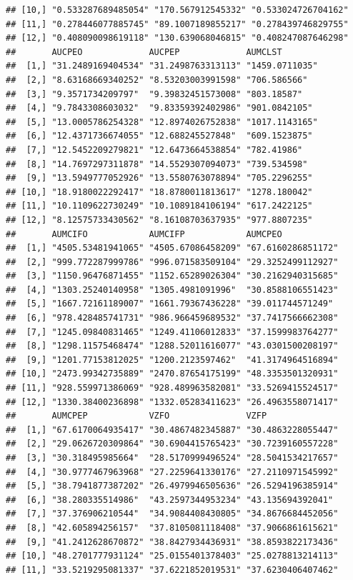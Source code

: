 \documentclass[]{krantz}
\theoremstyle{definition}
\theoremstyle{definition}
\theoremstyle{definition}
\theoremstyle{remark}
\begin{document}
\begin{verbatim}
## [10,] "0.533287689485054" "170.567912545332" "0.533024726704162"
## [11,] "0.278446077885745" "89.1007189855217" "0.278439746829755"
## [12,] "0.408090098619118" "130.639068046815" "0.408247087646298"
##       AUCPEO             AUCPEP             AUMCLST       
##  [1,] "31.2489169404534" "31.2498763313113" "1459.0711035"
##  [2,] "8.63168669340252" "8.53203003991598" "706.586566"  
##  [3,] "9.3571734209797"  "9.39832451573008" "803.18587"   
##  [4,] "9.7843308603032"  "9.83359392402986" "901.0842105" 
##  [5,] "13.0005786254328" "12.8974026752838" "1017.1143165"
##  [6,] "12.4371736674055" "12.688245527848"  "609.1523875" 
##  [7,] "12.5452209279821" "12.6473664538854" "782.41986"   
##  [8,] "14.7697297311878" "14.5529307094073" "739.534598"  
##  [9,] "13.5949777052926" "13.5580763078894" "705.2296255" 
## [10,] "18.9180022292417" "18.8780011813617" "1278.180042" 
## [11,] "10.1109622730249" "10.1089184106194" "617.2422125" 
## [12,] "8.12575733430562" "8.16108703637935" "977.8807235" 
##       AUMCIFO            AUMCIFP            AUMCPEO           
##  [1,] "4505.53481941065" "4505.67086458209" "67.6160286851172"
##  [2,] "999.772287999786" "996.071583509104" "29.3252499112927"
##  [3,] "1150.96476871455" "1152.65289026304" "30.2162940315685"
##  [4,] "1303.25240140958" "1305.4981091996"  "30.8588106551423"
##  [5,] "1667.72161189007" "1661.79367436228" "39.011744571249" 
##  [6,] "978.428485741731" "986.966459689532" "37.7417566662308"
##  [7,] "1245.09840831465" "1249.41106012833" "37.1599983764277"
##  [8,] "1298.11575468474" "1288.52011616077" "43.0301500208197"
##  [9,] "1201.77153812025" "1200.2123597462"  "41.3174964516894"
## [10,] "2473.99342735889" "2470.87654175199" "48.3353501320931"
## [11,] "928.559971386069" "928.489963582081" "33.5269415524517"
## [12,] "1330.38400236898" "1332.05283411623" "26.4963558071417"
##       AUMCPEP            VZFO               VZFP              
##  [1,] "67.6170064935417" "30.4867482345887" "30.4863228055447"
##  [2,] "29.0626720309864" "30.6904415765423" "30.7239160557228"
##  [3,] "30.318495985664"  "28.5170999496524" "28.5041534217657"
##  [4,] "30.9777467963968" "27.2259641330176" "27.2110971545992"
##  [5,] "38.7941877387202" "26.4979946505636" "26.5294196385914"
##  [6,] "38.280335514986"  "43.2597344953234" "43.135694392041" 
##  [7,] "37.376906210544"  "34.9084408430805" "34.8676684452056"
##  [8,] "42.605894256157"  "37.8105081118408" "37.9066861615621"
##  [9,] "41.2412628670872" "38.8427934436931" "38.8593822173436"
## [10,] "48.2701777931124" "25.0155401378403" "25.0278813214113"
## [11,] "33.5219295081337" "37.6221852019531" "37.6230406407462"

\end{verbatim}
\end{document}
